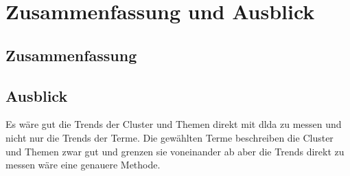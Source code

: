 \chapter{Zusammenfassung und Ausblick}

\section{Zusammenfassung}


\section{Ausblick}


Es wäre gut die Trends der Cluster und Themen direkt mit \gls{dlda} zu messen und nicht nur die Trends der Terme. Die gewählten Terme beschreiben die Cluster und Themen zwar gut und grenzen sie voneinander ab aber die Trends direkt zu messen wäre eine genauere Methode.


